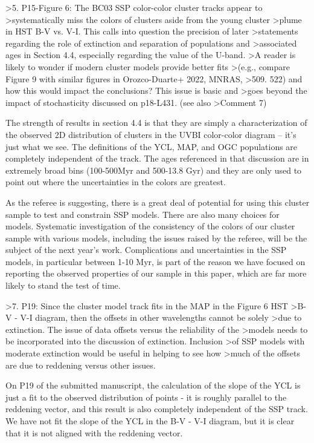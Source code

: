 >5. P15-Figure 6: The BC03 SSP color-color cluster tracks appear to 
>systematically miss the colors of clusters aside from the young cluster 
>plume in HST B-V vs. V-I. This calls into question the precision of later 
>statements regarding the role of extinction and separation of populations and
>associated ages in Section 4.4, especially regarding the value of the U-band.
>A reader is likely to wonder if modern cluster models provide better fits 
>(e.g., compare Figure 9 with similar figures in Orozco-Duarte+ 2022, MNRAS,
>509. 522) and how this would impact the conclusions? This issue is basic and 
>goes beyond the impact of stochasticity discussed on p18-L431. (see also 
>Comment 7)

The strength of results in section 4.4 is that they are simply a characterization of the observed 2D distribution of clusters in the UVBI color-color diagram -- it's just what we see.  The definitions of the YCL, MAP, and OGC populations are completely independent of the track.  The ages referenced in that discussion are in extremely broad bins (100-500Myr and 500-13.8 Gyr) and they are only used to point out where the uncertainties in the colors are greatest.  

As the referee is suggesting, there is a great deal of potential for using this cluster sample to test and constrain SSP models.  There are also many choices for models.  Systematic investigation of the consistency of the colors of our cluster sample with various models, including the issues raised by the referee, will be the subject of the next year's work.  Complications and uncertainties in the SSP models, in particular between 1-10 Myr, is part of the reason we have focused on reporting the observed properties of our sample in this paper, which are far more likely to stand the test of time.

>7. P19: Since the cluster model track fits in the MAP in the Figure 6 HST
>B-V - V-I diagram, then the offsets in other wavelengths cannot be solely 
>due to extinction. The issue of data offsets versus the reliability of the
>models needs to be incorporated into the discussion of extinction. Inclusion
>of SSP models with moderate extinction would be useful in helping to see how
>much of the offsets are due to reddening versus other issues.

On P19 of the submitted manuscript, the calculation of the slope of the YCL is just a fit to the observed distribution of points - it is roughly parallel to the reddening vector, and this result is also completely independent of the SSP track.  We have not fit the slope of the YCL in the B-V - V-I diagram, but it is clear that it is not aligned with the reddening vector.

